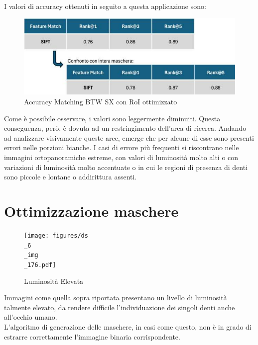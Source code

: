 \documentclass[12pt,a4paper,openright,twoside]{book}
\begin{document}
I valori di accuracy ottenuti in seguito a questa applicazione sono:
\begin{figure}[H]
	\centering
	\includegraphics{figures/sx11_1.pdf}
    	\caption{Accuracy Matching BTW SX con RoI ottimizzato}
	\label{fig:sx11}
\end{figure}
Come è possibile osservare, i valori sono leggermente diminuiti. Questa conseguenza, però, è dovuta ad un restringimento dell'area di ricerca. Andando ad analizzare visivamente queste aree, emerge che per alcune di esse sono presenti errori nelle porzioni bianche. I casi di errore più frequenti si riscontrano nelle immagini ortopanoramiche estreme, con valori di luminosità molto alti o con variazioni di luminosità molto accentuate o in cui le regioni di presenza di denti sono piccole e lontane o addirittura assenti.


\section{Ottimizzazione maschere}
\begin{figure}[H]
	\centering
	\texttt{[image: figures/ds\\\_6\\\_img\\\_176.pdf]}
    	\caption{Luminosità Elevata}
	\label{fig:luminosità}
\end{figure}
Immagini come quella sopra riportata presentano un livello di luminosità talmente elevato, da rendere difficile l'individuazione dei singoli denti anche all'occhio umano. \\
L'algoritmo di generazione delle maschere, in casi come questo, non è in grado di estrarre correttamente l'immagine binaria corrispondente.
\end{document}
